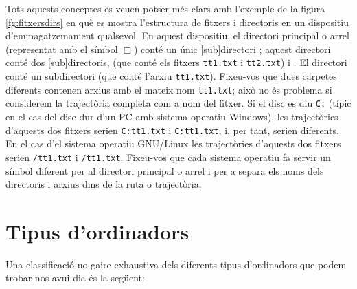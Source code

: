 Tots aquests conceptes es veuen potser més clars amb l'exemple de la
figura \ref{fg:fitxersdirs} en què es mostra l'estructura de fitxers i
directoris en un dispositiu d'emmagatzemament qualsevol. En aquest
dispositiu, el directori principal o arrel (representat amb el símbol
$\Box$) conté un únic [sub]directori ; aquest directori
conté dos [sub]directoris,  (que conté els fitxers
\texttt{tt1.txt} i \texttt{tt2.txt}) i .  El directori
 conté un subdirectori  (que conté l'arxiu
\texttt{tt1.txt}). Fixeu-vos que dues carpetes diferents contenen
arxius amb el mateix nom \texttt{tt1.txt}; això no és problema si
considerem la trajectòria completa com a nom del fitxer. Si el disc es
diu \texttt{C:} (típic en el cas del disc dur d'un PC amb sistema
operatiu Windows), les trajectòries d'aquests dos fitxers serien
\texttt{C:}\barra{}\barra{}\barra\texttt{tt1.txt} i
\texttt{C:}\barra{}\barra{}\barra{}\barra\texttt{tt1.txt},
i, per tant, serien diferents. En el cas d'el sistema operatiu
GNU/Linux les trajectòries d'aquests dos fitxers serien
\texttt{/}\texttt{tt1.txt} i
\texttt{/}\texttt{tt1.txt}. Fixeu-vos
que cada sistema operatiu fa servir un símbol diferent per al
directori principal o arrel i per a separa els noms dels directoris i
arxius dins de la ruta o trajectòria.

\section{Tipus d'ordinadors}
Una classificació no gaire exhaustiva dels diferents tipus
d'ordinadors que podem trobar-nos avui dia és la següent:

